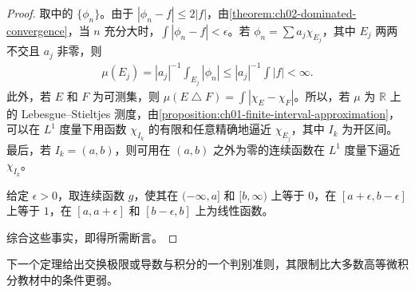 \documentclass[../../main.tex]{subfiles}%
\begin{document}
\begin{proof}
取中的 $\{\phi_n\}$。由于 $|\phi_n-f|\le2|f|$，由\cref{theorem:ch02-dominated-convergence}，当 $n$ 充分大时，$\int|\phi_n-f|<\epsilon$。若 $\phi_n=\sum a_j\chi_{E_j}$，其中 $E_j$ 两两不交且 $a_j$ 非零，则
\begin{align*}
\mu(E_j)=|a_j|^{-1}\int_{E_j}|\phi_n|\le|a_j|^{-1}\int|f|<\infty.
\end{align*}
此外，若 $E$ 和 $F$ 为可测集，则 $\mu(E\mathbin{\triangle}F)=\int|\chi_E-\chi_F|$。所以，若 $\mu$ 为 $\mathbb{R}$ 上的 Lebesgue--Stieltjes 测度，由\cref{proposition:ch01-finite-interval-approximation}，可以在 $L^1$ 度量下用函数 $\chi_{I_k}$ 的有限和任意精确地逼近 $\chi_{E_j}$，其中 $I_k$ 为开区间。最后，若 $I_k=(a,b)$，则可用在 $(a,b)$ 之外为零的连续函数在 $L^1$ 度量下逼近 $\chi_{I_k}$。
\begin{example*}
给定 $\epsilon>0$，取连续函数 $g$，使其在 $(-\infty,a]$ 和 $[b,\infty)$ 上等于 $0$，在 $[a+\epsilon,b-\epsilon]$ 上等于 $1$，在 $[a,a+\epsilon]$ 和 $[b-\epsilon,b]$ 上为线性函数。
\end{example*}
综合这些事实，即得所需断言。
\end{proof}
下一个定理给出交换极限或导数与积分的一个判别准则，其限制比大多数高等微积分教材中的条件更弱。
\end{document}
